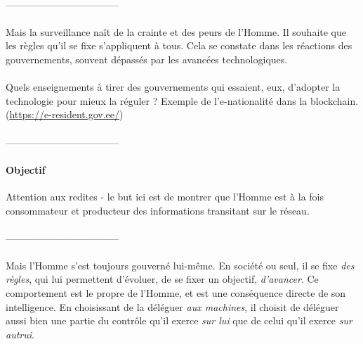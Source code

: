 \paragraph{} -----------------------------------

\paragraph{} Mais la surveillance naît de la crainte et des peurs de l'Homme. 
Il souhaite que les règles qu'il se fixe s'appliquent à tous. Cela se constate
dans les réactions des gouvernements, souvent dépassés par les avancées technologiques.

\paragraph{} Quels enseignements à tirer des gouvernements qui essaient, eux, 
d'adopter la technologie pour mieux la réguler ? Exemple de l'e-nationalité
dans la blockchain. (\url{https://e-resident.gov.ee/})

\paragraph{} -----------------------------------

\paragraph{Objectif} Attention aux redites - le but ici est de montrer que l'Homme est à la fois
consommateur et producteur des informations transitant sur le réseau.

\paragraph{} -----------------------------------

\paragraph{} Mais l'Homme s'est toujours gouverné lui-même. En société ou seul, il se fixe
\emph{des règles}, qui lui permettent d'évoluer, de se fixer un objectif, \emph{d'avancer}.
Ce comportement est le propre de l'Homme, et est une conséquence directe de son intelligence.
En choisissant de la déléguer \emph{aux machines}, il choisit de déléguer aussi
bien une partie du contrôle qu'il exerce \emph{sur lui} que de celui qu'il exerce \emph{sur autrui}.